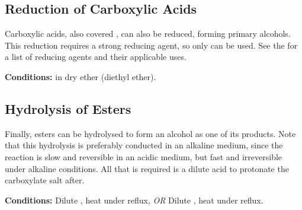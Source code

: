 




		\pagebreak
		\subsection{Reduction of Carboxylic Acids}

			Carboxylic acids, also covered \hyperlink{ChapterCarboxylicAcids}{}, can also be reduced, forming primary alcohols.
			This reduction requires a strong reducing agent, so only  can be used. See the
			\hyperlink{AppendixReducingAgents}{} for a list of reducing agents and their applicable uses.

			\vspace{1.5em}
			\vbox{\textbf{Conditions:}\tabto{35mm} in dry ether (diethyl ether).}




		\subsection{Hydrolysis of Esters}

			Finally, esters can be hydrolysed to form an alcohol as one of its products. Note that this hydrolysis is preferably conducted
			in an alkaline medium, since the reaction is slow and reversible in an acidic medium, but fast and irreversible under
			alkaline conditions. All that is required is a dilute acid to protonate the carboxylate salt after.


			\vspace{1.5em}
			\vbox{\textbf{Conditions:}	\tabto{35mm}Dilute , heat under reflux, \textit{OR}
										\tabto{35mm}Dilute , heat under reflux.}

